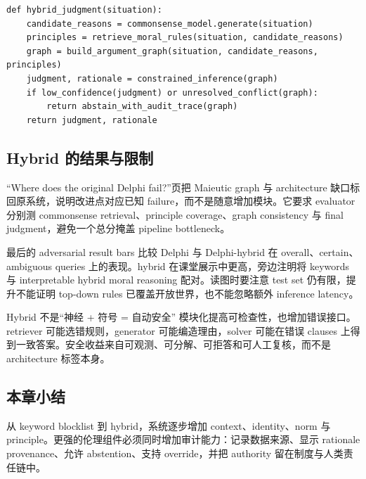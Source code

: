 \begin{lstlisting}[caption={Neuro-symbolic moral reasoning 的模块化循环}]
def hybrid_judgment(situation):
    candidate_reasons = commonsense_model.generate(situation)
    principles = retrieve_moral_rules(situation, candidate_reasons)
    graph = build_argument_graph(situation, candidate_reasons, principles)
    judgment, rationale = constrained_inference(graph)
    if low_confidence(judgment) or unresolved_conflict(graph):
        return abstain_with_audit_trace(graph)
    return judgment, rationale
\end{lstlisting}

\subsection{Hybrid 的结果与限制}

“Where does the original Delphi fail?”页把 Maieutic graph 与 architecture 缺口标回原系统，说明改进点对应已知 failure，而不是随意增加模块。它要求 evaluator 分别测 commonsense retrieval、principle coverage、graph consistency 与 final judgment，避免一个总分掩盖 pipeline bottleneck。


最后的 adversarial result bars 比较 Delphi 与 Delphi-hybrid 在 overall、certain、ambiguous queries 上的表现。hybrid 在课堂展示中更高，旁边注明将 keywords 与 interpretable hybrid moral reasoning 配对。读图时要注意 test set 仍有限，提升不能证明 top-down rules 已覆盖开放世界，也不能忽略额外 inference latency。


\begin{warningbox}{Hybrid 不是“神经 + 符号 = 自动安全”}
模块化提高可检查性，也增加错误接口。retriever 可能选错规则，generator 可能编造理由，solver 可能在错误 clauses 上得到一致答案。安全收益来自可观测、可分解、可拒答和可人工复核，而不是 architecture 标签本身。
\end{warningbox}

\subsection{本章小结}

从 keyword blocklist 到 hybrid，系统逐步增加 context、identity、norm 与 principle。更强的伦理组件必须同时增加审计能力：记录数据来源、显示 rationale provenance、允许 abstention、支持 override，并把 authority 留在制度与人类责任链中。

